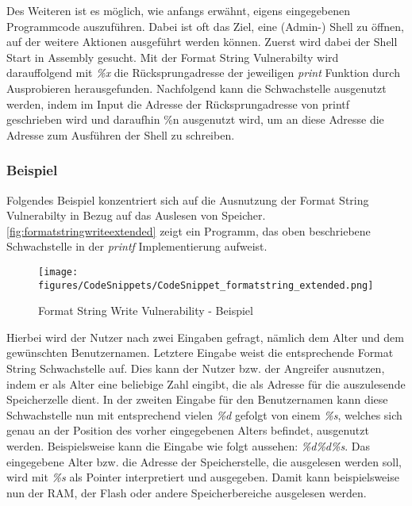 \documentclass[a4paper,
DIV=13,
12pt,
BCOR=10mm,
department=FakIM,
oneside,
parskip=half,
automark,
listof=totocnumbered,
bibliography=totocnumbered,
acronym=totocnumbered
] {OTHRartcl}
\begin{document}
Des Weiteren ist es möglich, wie anfangs erwähnt, eigens eingegebenen Programmcode auszuführen. Dabei ist oft das Ziel,
eine (Admin-) Shell zu öffnen, auf der weitere Aktionen ausgeführt werden können.
Zuerst wird dabei der Shell Start in Assembly gesucht. Mit der Format String Vulnerabilty wird darauffolgend mit \textit{\%x} die Rücksprungadresse
der jeweiligen \textit{print} Funktion durch Ausprobieren herausgefunden. Nachfolgend kann die Schwachstelle ausgenutzt werden, indem im Input die Adresse der Rücksprungadresse von printf geschrieben wird
und daraufhin \%n ausgenutzt wird, um an diese Adresse die Adresse zum Ausführen der Shell zu schreiben. \cite{Format String Exploits}

\subsubsection{Beispiel}
Folgendes Beispiel konzentriert sich auf die Ausnutzung der Format String Vulnerabilty in Bezug auf das Auslesen von Speicher.
\autoref{fig:formatstringwriteextended} zeigt ein Programm, das oben beschriebene Schwachstelle in der \textit{printf} Implementierung aufweist.
\begin{figure}[ht!]
  \begin{center}
    \texttt{[image: figures/CodeSnippets/CodeSnippet\_formatstring\_extended.png]}
    \caption{Format String Write Vulnerability - Beispiel}
    \label{fig:formatstringwriteextended}
  \end{center}
\end{figure}
Hierbei wird der Nutzer nach zwei Eingaben gefragt, nämlich dem Alter und dem gewünschten Benutzernamen.
Letztere Eingabe weist die entsprechende Format String Schwachstelle auf.
Dies kann der Nutzer bzw. der Angreifer ausnutzen, indem er als Alter eine beliebige Zahl eingibt, die als Adresse für die auszulesende Speicherzelle dient.
In der zweiten Eingabe für den Benutzernamen kann diese Schwachstelle nun mit entsprechend vielen \textit{\%d} gefolgt von einem \textit{\%s}, welches sich genau an der Position des
vorher eingegebenen Alters befindet, ausgenutzt werden. Beispielsweise kann die Eingabe wie folgt aussehen: \textit{\%d\%d\%s}.
Das eingegebene Alter bzw. die Adresse der Speicherstelle, die ausgelesen werden soll, wird mit \textit{\%s} als Pointer interpretiert und ausgegeben.
Damit kann beispielsweise nun der RAM, der Flash oder andere Speicherbereiche ausgelesen werden.
\end{document}
